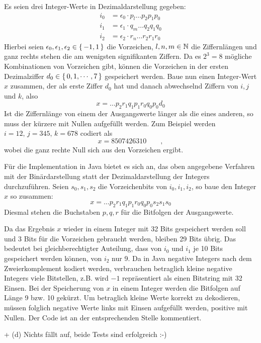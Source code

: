 \documentclass[a4paper,11pt]{article}             %
\begin{document}
\setcounter{excnt}{10}
\begin{ex}
\begin{exlist}
  \leavevmode
\item
Es seien drei Integer-Werte in Dezimaldarstellung gegeben:
\begin{align*}
 i_0&=\epsilon_0\cdot p_{l}\dots p_{2}p_{1}p_{0} \\
 i_1&=\epsilon_1\cdot q_{m}\dots q_{2}q_{1}q_{0} \\
 i_2&=\epsilon_2\cdot r_{n}\dots r_{2}r_{1}r_{0}
\end{align*}
Hierbei seien $\epsilon_0,\epsilon_1,\epsilon_2\in\set{-1, 1}$ die Vorzeichen,
$l, n, m\in\mathbb{N}$ die Ziffernlängen und ganz rechts stehen die am wenigsten
signifikanten Ziffern.
Da es $2^3=8$ mögliche Kombinationen von Vorzeichen gibt, können die
Vorzeichen in der ersten Dezimalziffer $d_0\in\set{0, 1,\cdots, 7}$ gespeichert
werden. Baue nun einen Integer-Wert $x$ zusammen, der als erste Ziffer $d_0$
hat und danach abwechselnd Ziffern von $i, j$ und $k$, also
\begin{equation*}
 x = \dots p_2r_1q_1p_1r_{0}q_{0}p_{0}d_0 
\end{equation*}
Ist die Ziffernlänge von einem der Ausgangswerte länger als die eines anderen, so
muss der kürzere mit Nullen aufgefüllt werden. Zum Beispiel werden $i=12,
\,j=345,\, k=678$ codiert als
\begin{equation*}
 x = 8507426310 \qquad ,
\end{equation*}
wobei die ganz rechte Null sich aus den Vorzeichen ergibt.
\item 
  Für die Implementation in Java bietet es sich an, das oben angegebene
  Verfahren mit der Binärdarstellung statt der Dezimaldarstellung der Integers
  durchzuführen. Seien $s_0, s_1, s_2$ die Vorzeichenbits von $i_0, i_1, i_2$,
  so baue den Integer $x$ so zusammen:
  \begin{equation*}
 x = \dots p_2r_1q_1p_1r_{0}q_{0}p_{0}s_2s_1s_0
  \end{equation*}
  Diesmal stehen die Buchstaben $p, q, r$ für die Bitfolgen der Ausgangswerte.

Da das Ergebnis $x$ wieder in einem Integer mit 32 Bits gespeichert werden soll
und 3 Bits für die Vorzeichen gebraucht werden, bleiben 29 Bits übrig.
Das bedeutet bei gleichberechtigter Auteilung, dass von $i_0$ und $i_1$ je 10
Bits gespeichert werden können, von $i_2$ nur 9.
Da in Java negative Integers nach dem Zweierkomplement kodiert werden, verbrauchen
betraglich kleine negative Integers viele Bitstellen, z.B. wird $-1$
repräsentiert als einen Bitstring mit 32 Einsen. Bei der Speicherung von $x$ in
einem Integer werden die Bitfolgen auf Länge 9 bzw. 10 gekürzt. Um betraglich
kleine Werte korrekt zu dekodieren, müssen folglich negative Werte links mit
Einsen aufgefüllt werden, positive mit Nullen. Der Code ist an der
entsprechenden Stelle kommentiert.
\item + (d) Nichts fällt auf, beide Tests sind erfolgreich :-) 
\end{exlist}
\end{ex}
\end{document}
